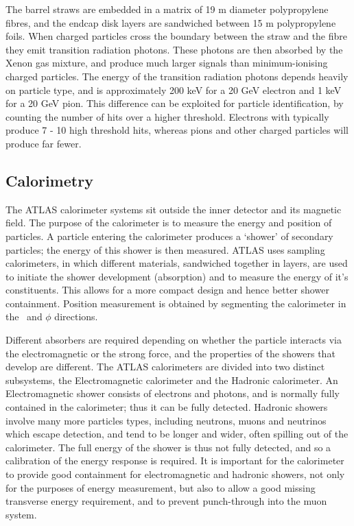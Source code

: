 The barrel straws are embedded in a matrix of 19 \micro m diameter polypropylene
fibres, and the endcap disk layers are sandwiched between 15 \micro m
polypropylene foils. When charged particles cross the boundary between the straw
and the fibre they emit
transition radiation photons. These photons are then absorbed by the Xenon gas
mixture, and produce much larger signals than minimum-ionising
charged particles. The energy of the transition radiation photons depends
heavily on particle type, and is approximately 200 keV for a 20 GeV electron and
1 keV for a 20 GeV pion. This difference can be exploited for particle
identification, by counting the number of hits over a higher threshold.
Electrons with  typically produce 7 - 10 high threshold hits, whereas
pions and other charged particles will produce far fewer.

\subsection{Calorimetry}

The ATLAS
calorimeter systems sit outside the inner detector and its magnetic field. 
The purpose of the calorimeter is to measure the energy and
position of particles. A particle entering the calorimeter produces a
`shower' of secondary particles; the energy of this shower is then measured.
ATLAS uses sampling calorimeters, in which different materials, sandwiched
together in layers, are used to initiate the shower development (absorption) and
to measure the energy of it's constituents. This
allows for a more compact design and hence better shower containment. Position
measurement is obtained by segmenting the calorimeter in the \z\ and $\phi$
directions.

Different absorbers are required depending on whether the particle interacts
via the electromagnetic or the strong force, and the properties of the showers that develop
are different. The ATLAS calorimeters are divided into two distinct subsystems,
the Electromagnetic calorimeter and the Hadronic calorimeter. An Electromagnetic
shower consists of electrons and photons, and is normally fully contained in the
calorimeter; thus it can be fully detected. Hadronic showers involve many more
particles types, including neutrons, muons and neutrinos which escape detection, and tend
to be longer and wider, often spilling out of the calorimeter. The full energy
of the shower is thus not fully detected, and so a calibration of the energy
response is required. It is important for the calorimeter to provide good
containment for electromagnetic and hadronic showers, not only for the purposes
of energy measurement, but also to allow a good missing transverse energy
requirement, and to prevent punch-through into the muon system.

